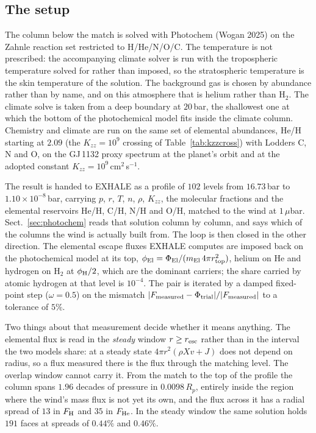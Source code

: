 \documentclass[english,a4paper]{my_memo}
\begin{document}
\subsection{The setup}

The column below the match is solved with Photochem (Wogan 2025) on the
Zahnle reaction set restricted to H/He/N/O/C. The temperature is not
prescribed: the accompanying climate solver is run with the tropospheric
temperature solved for rather than imposed, so the stratospheric temperature
is the skin temperature of the solution. The background gas is chosen by
abundance rather than by name, and on this atmosphere that is helium rather
than H$_2$. The climate solve is taken from a deep boundary at $20$\,bar, the
shallowest one at which the bottom of the photochemical model fits inside the
climate column. Chemistry and climate are run on the same set of elemental
abundances, He/H starting at $2.09$ (the $K_{zz} = 10^{9}$ crossing of
Table~\ref{tab:kzzcross}) with Lodders C, N and O, on the GJ\,1132 proxy
spectrum at the planet's orbit and at the adopted constant
$K_{zz} = 10^{9}$\,cm$^2$\,s$^{-1}$.

The result is handed to EXHALE as a profile of $102$ levels from $16.73$\,bar
to $1.10\times10^{-8}$\,bar, carrying $p$, $r$, $T$, $n$, $\rho$, $K_{zz}$,
the molecular fractions and the elemental reservoirs He/H, C/H, N/H and O/H,
matched to the wind at $1\,\mu$bar. Sect.~\ref{sec:photochem} reads that
solution column by column, and says which of the columns the wind is actually
built from. The loop is then closed in the other direction. The elemental
escape fluxes EXHALE computes are imposed back on the photochemical model at
its top, $\phi_{\rm El} = \Phi_{\rm El}/(m_{\rm El}\,4\pi r_{\rm top}^{2})$,
helium on He and hydrogen on H$_2$ at $\phi_{\rm H}/2$, which are the
dominant carriers; the share carried by atomic hydrogen at that level is
$10^{-4}$. The pair is iterated by a damped fixed-point step
($\omega = 0.5$) on the mismatch
$|F_{\rm measured} - \Phi_{\rm trial}|/|F_{\rm measured}|$ to a tolerance of
$5\%$.

Two things about that measurement decide whether it means anything. The
elemental flux is read in the \emph{steady} window $r \ge r_{\rm esc}$ rather
than in the interval the two models share: at a steady state
$4\pi r^2(\rho X v + J)$ does not depend on radius, so a flux measured there
is the flux through the matching level. The overlap window cannot carry it.
From the match to the top of the profile the column spans $1.96$ decades of
pressure in $0.0098\,R_p$, entirely inside the region where the wind's mass
flux is not yet its own, and the flux across it has a radial spread of $13$
in $F_{\rm H}$ and $35$ in $F_{\rm He}$. In the steady window the same
solution holds $191$ faces at spreads of $0.44\%$ and $0.46\%$.
\end{document}
